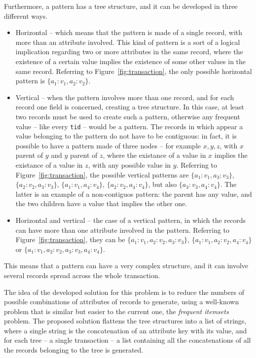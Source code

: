 \documentclass{acm_proc_article-sp-sigmod09}
\begin{document}
Furthermore, a pattern has a tree structure, and it can be developed in three different ways.
\begin{itemize}
\item Horizontal -- which means that the pattern is made of a single record, with more than an attribute involved. This kind of pattern is a sort of a logical implication regarding two or more attributes in the same record, where the existence of a certain value implies the existence of some other values in the same record. Referring to Figure~\ref{fig:transaction}, the only possible horizontal pattern is $\{a_1 \colon v_1, a_2 \colon v_2\}$.
\item Vertical -- when the pattern involves more than one record, and for each record one field is concerned, creating a tree structure. In this case, at least two records must be used to create such a pattern, otherwise any frequent value -- like every \texttt{tid} -- would be a pattern. The records in which appear a value belonging to the pattern do not have to be contiguous: in fact, it is possible to have a pattern made of three nodes -- for example $x, y, z$, with $x$ parent of $y$ and $y$ parent of $z$, where the existance of a value in $x$ implies the existance of a value in $z$, with any possible value in $y$. Referring to Figure~\ref{fig:transaction}, the possible vertical patterns are $\{a_1 \colon v_1, a_3 \colon v_3\}$, $\{a_2 \colon v_2, a_3 \colon v_3\}$, $\{a_1 \colon v_1, a_4 \colon v_4\}$, $\{a_2 \colon v_2, a_4 \colon v_4\}$, but also $\{a_3 \colon v_3, a_4 \colon v_4\}$. The latter is an example of a non-contiguos pattern: the parent has any value, and the two children have a value that implies the other one.
\item Horizontal and vertical -- the case of a vertical pattern, in which the records can have more than one attribute involved in the pattern. Referring to Figure~\ref{fig:transaction}, they can be $\{a_1 \colon v_1, a_2 \colon v_2, a_3 \colon v_3\}$, $\{a_1 \colon v_1, a_2 \colon v_2, a_4 \colon v_4\}$ or $\{a_1 \colon v_1, a_2 \colon v_2, a_3 \colon v_3, a_4 \colon v_4\}$.
\end{itemize}

This means that a pattern can have a very complex structure, and it can involve several records spread across the whole transaction.

The idea of the developed solution for this problem is to reduce the numbers of possible combinations of attributes of records to generate, using a well-known problem that is similar but easier to the current one, the \emph{frequent itemsets} problem. The proposed solution flattens the tree structures into a list of strings, where a single string is the concatenation of an attribute key with its value, and for each tree -- a single transaction -- a list containing all the concatenations of all the records belonging to the tree is generated. 
\end{document}
